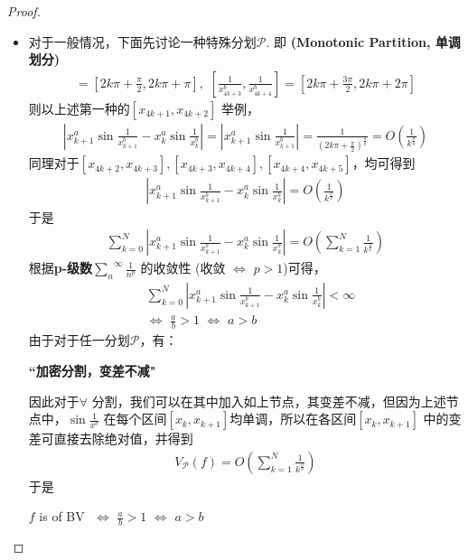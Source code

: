 \begin{example}
\begin{itemize}
\begin{proof}
\begin{itemize}
				\item 对于一般情况，下面先讨论一种特殊分划$\mathcal{P}$. 即 \textbf{(Monotonic Partition, 单调划分)}
				\begin{align}
					[\frac{1}{x_{4k + 1}^b} , \frac{1}{x_{4k + 2}^b}] = [2k\pi + \frac{\pi}{2}, 2k\pi + \pi] , \,\,
					[\frac{1}{x_{4k + 3}^b} , \frac{1}{x_{4k + 4}^b}] = [2k\pi + \frac{3\pi}{2} , 2k\pi + 2\pi]
				\end{align}
				则以上述第一种的$[x_{4k + 1} , x_{4k + 2}]$ 举例，
				\begin{align}
					\left| x_{k + 1}^{a} \sin{\frac{1}{x_{k + 1}^{b}}} - x_{k}^{a} \sin{\frac{1}{x_{k}^{b}}} \right|
					= \left| x_{k + 1}^{a} \sin{\frac{1}{x_{k + 1}^{b}}} \right|
					= \frac{1}{(2k\pi + \frac{\pi}{2})^{\frac{a}{b}}}
					= O(\frac{1}{k^{\frac{a}{b}}})
				\end{align}
				同理对于$[x_{4k + 2} , x_{4k + 3}] , [x_{4k + 3} , x_{4k + 4}]  ,[x_{4k + 4} , x_{4k + 5}]$，均可得到
				\begin{align}
					\left| x_{k + 1}^{a} \sin{\frac{1}{x_{k + 1}^{b}}} - x_{k}^{a} \sin{\frac{1}{x_{k}^{b}}} \right|
					= O(\frac{1}{k^{\frac{a}{b}}})
				\end{align}
				于是
				\begin{align}
					\sum_{k = 0}^{N}{\left| x_{k + 1}^{a} \sin{\frac{1}{x_{k + 1}^{b}}} - x_{k}^{a} \sin{\frac{1}{x_{k}^{b}}} \right|}
					= O\left( \sum_{k = 1}^{N}{\frac{1}{k^{\frac{a}{b}}}} \right)
				\end{align}
				根据\textbf{p-级数}$\overset{\infty}{\underset{n}{\sum}}{\frac{1}{n^p}}$ 的收敛性 (收敛 $\Leftrightarrow$ $p > 1$)可得，
				\begin{align}
					&\sum_{k = 0}^{N}{\left| x_{k + 1}^{a} \sin{\frac{1}{x_{k + 1}^{b}}} - x_{k}^{a} \sin{\frac{1}{x_{k}^{b}}} \right|} < \infty \\
					&\Leftrightarrow \,\, \frac{a}{b} > 1 \,\, \Leftrightarrow \,\, a > b
				\end{align}
				由于对于任一分划$\mathcal{P}$，有：
				\begin{center}
					\textbf{``加密分割，变差不减"}
				\end{center}
				因此对于$\forall$ 分割，我们可以在其中加入如上节点，其变差不减，但因为上述节点中，$\sin{\frac{1}{x^b}}$ 在每个区间$[x_k , x_{k + 1}]$均单调，所以在各区间$[x_k , x_{k + 1}]$ 中的变差可直接去除绝对值，并得到
				\begin{align}
					V_{\mathcal{P}}(f) = O\left( \sum_{k = 1}^{N}{\frac{1}{k^{\frac{a}{b}}}} \right)
				\end{align}
				于是
				\begin{center}
					$f$ is of BV $\,\, \Leftrightarrow \,\, \frac{a}{b} > 1 \,\, \Leftrightarrow \,\, a > b$
				\end{center}
				\end{itemize}
			\end{proof}
		\end{itemize}
	\end{example}

